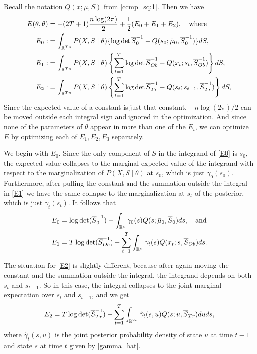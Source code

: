 \documentclass[12pt,leqno]{article}
\begin{document}
  
Recall the notation $Q(x;\mu,S)$ from \eqref{comp_sq:1}.  Then we have
\begin{align}
  E(\theta,\bar{\theta}) &= -(2T+1)\frac{n\log(2\pi)}{2} + \frac{1}{2}(E_0 + E_1 + E_2),\quad\text{where}\notag\\
  E_0 :&=\int_{{\mathbb R}^{Tn}}P(X,S\mid\theta)\{\log\det\overline{S}^{-1}_0 - Q(s_0;\bar{\mu}_0,\overline{S}_0^{-1})\}dS,\label{E0}\\
  E_1 :&= \int_{{\mathbb R}^{Tn}}P(X,S\mid\theta)\left\{\sum_{t=1}^T\log\det\overline{S}^{-1}_{Ob} - Q(x_t;s_t,\overline{S}_{Ob}^{-1})\right\}dS,
\label{E1}\\
  E_2 :&= \int_{{\mathbb R}^{Tn}}P(X,S\mid\theta)\left\{\sum_{t=1}^T\log\det\overline{S}^{-1}_{Tr} - Q(s_t;s_{t-1},\overline{S}_{Tr}^{-1})\right\}dS,
\label{E2}
\end{align}
Since the expected value of a constant is just that constant, $-n\log(2\pi)/2$ can be moved outside each
integral sign and ignored in the optimization.  And since none of the parameters of $\theta$ appear in more
than one of the $E_i$, we can optimize $E$ by optimizing each of $E_1,E_2,E_3$ separately.

We begin with $E_0$. Since the only component of $S$ in the integrand of \eqref{E0} is $s_0$, the expected value
collapses to the marginal 
expected value of the integrand with respect to the marginalization of $P(X,S\mid\theta)$ at $s_0$, which is just 
$\gamma_0(s_0)$.  Furthermore, after pulling the constant and the summation 
outside the integral in \eqref{E1} we have the same collapse to the marginalization at $s_t$ of the posterior, which
is just $\gamma_t(s_t)$.  It follows that
\begin{align*}
E_0 &= \log\det(\overline{S}^{-1}_0) - \int_{{\mathbb R}^n}\gamma_0(s)Q(s;\bar{\mu}_0,\overline{S}_0)ds,\quad\text{and}\\
E_1 &= T\log\det(\overline{S}^{-1}_{Ob}) - \sum_{t=1}^T\int_{{\mathbb R}^n}\gamma_t(s)Q(x_t;s,\overline{S}_{Ob})ds.
\end{align*}

The situation for \eqref{E2} is slightly different, because after again moving the constant and the summation outside
the integral, the integrand depends on both $s_t$ and $s_{t-1}$.  So in this case, the integral collapses to the 
joint marginal expectation over $s_t$ and $s_{t-1}$, and we get
$$
E_2 = T\log\det(\overline{S}^{-1}_{Tr}) - \sum_{t=1}^T\int_{{\mathbb R}^{2n}}\hat{\gamma}_t(s,u)Q(s;u,\overline{S}_{Tr})duds,
$$
where $\hat{\gamma}_t(s,u)$ is the joint posterior probability density of state $u$ at time $t-1$ and state $s$ 
at time $t$ given by \eqref{gamma_hat}.
\end{document}
